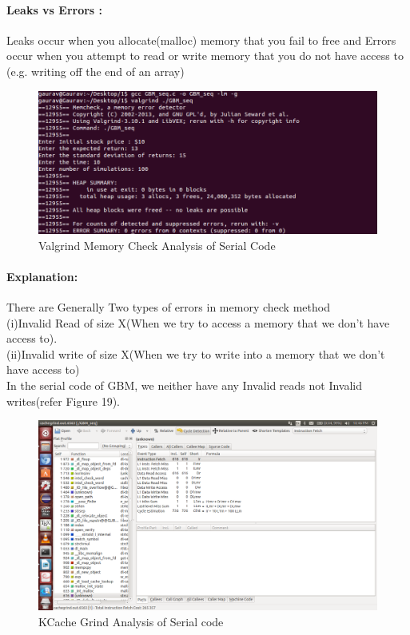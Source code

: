 \documentclass[10pt,a4paper]{article}
\begin{document}
\paragraph{Leaks vs Errors :}
Leaks occur when you allocate(malloc) memory that you fail to free and Errors occur when you attempt to read or write memory that you do not have access to (e.g. writing off the end of an array)\\ 
\begin{figure}[h]
\centering
\includegraphics[scale=0.4]{Valgrind_GBM_seq_C}
\caption{Valgrind Memory Check Analysis of Serial Code}
\end{figure}
\newpage
\paragraph{Explanation:} 
There are Generally Two types of errors in memory check method\\ 
  (i)Invalid Read of size X(When we try to access a memory that we don't   
     have access to).\\
  (ii)Invalid write of size X(When we try to write into a memory that we 
      don't have access to)\\
In the serial code of GBM, we neither have any Invalid reads not Invalid     
writes(refer Figure 19).\\
\begin{figure}[h]
\includegraphics[scale=0.26]{k_cache_grind_serial}
\caption{KCache Grind Analysis of Serial code}
\end{figure}
\end{document}
